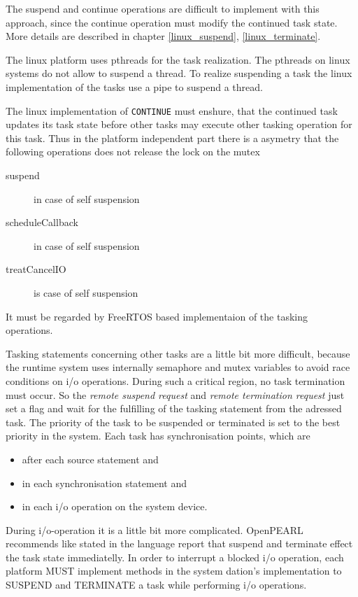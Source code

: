 The suspend and continue operations are difficult to implement with this approach,
since the continue operation must modify the continued task state.
More details are described in chapter \ref{linux_suspend}, \ref{linux_terminate}.

The linux platform uses pthreads for the task realization. The pthreads on linux systems
do not allow to suspend a thread. To realize suspending a task the linux 
implementation of the tasks use a pipe to suspend a thread. 

The linux implementation of \texttt{CONTINUE} must enshure, that the continued task 
updates its task state before other tasks may execute other tasking operation for this task.
Thus in the platform independent part there is a asymetry that the following operations
does not release the lock on the mutex 
\begin{description}
\item [suspend] in case of self suspension
\item [scheduleCallback] in case of self suspension
\item [treatCancelIO] is case of self suspension
\end{description}
It must be regarded by FreeRTOS based implementaion of the tasking operations.


Tasking statements concerning other tasks are a little 
bit more difficult, because the runtime system uses internally semaphore
 and mutex
variables to avoid race conditions on i/o operations.
During such a critical region,
no task termination must occur. So the  {\em remote suspend request} and 
{\em remote termination request} just set a flag and wait for the fulfilling
 of the 
tasking statement from the adressed task. The priority of the 
task to be suspended or terminated is set to the best priority in the system.
Each task has synchronisation points,
which are
\begin{itemize}
\item  after each source statement and
\item  in each synchronisation statement and 
\item in each i/o operation on the system device.
\end{itemize}

During i/o-operation it is a little bit more complicated. OpenPEARL
recommends like stated in the language report that suspend and terminate
effect the task state immediatelly.
In order to interrupt a blocked i/o operation, each platform MUST implement 
methods in the system dation's implementation to SUSPEND and TERMINATE a task while 
performing i/o operations.

